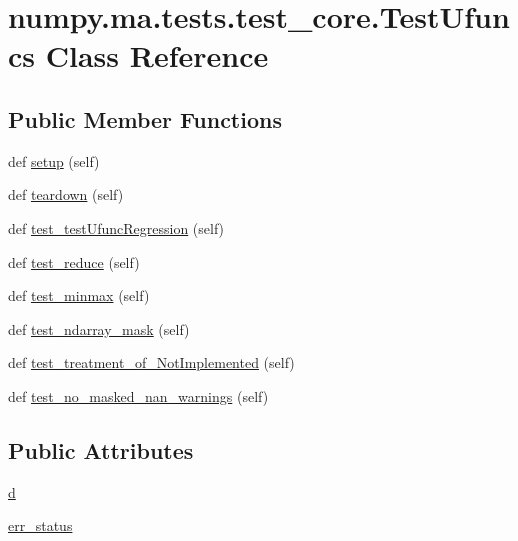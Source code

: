 \hypertarget{classnumpy_1_1ma_1_1tests_1_1test__core_1_1TestUfuncs}{}\section{numpy.\+ma.\+tests.\+test\+\_\+core.\+Test\+Ufuncs Class Reference}
\label{classnumpy_1_1ma_1_1tests_1_1test__core_1_1TestUfuncs}
\subsection*{Public Member Functions}
\begin{DoxyCompactItemize}
\item 
def \hyperlink{classnumpy_1_1ma_1_1tests_1_1test__core_1_1TestUfuncs_ae4b69c0da441b994929796cde8367c26}{setup} (self)
\item 
def \hyperlink{classnumpy_1_1ma_1_1tests_1_1test__core_1_1TestUfuncs_a0fa08a88d54511c481212879f6190aa0}{teardown} (self)
\item 
def \hyperlink{classnumpy_1_1ma_1_1tests_1_1test__core_1_1TestUfuncs_afe19a18d7c7882e99867d5b29beeda1f}{test\+\_\+test\+Ufunc\+Regression} (self)
\item 
def \hyperlink{classnumpy_1_1ma_1_1tests_1_1test__core_1_1TestUfuncs_abd06c0ee9a6edbfdf91a501edf1ca208}{test\+\_\+reduce} (self)
\item 
def \hyperlink{classnumpy_1_1ma_1_1tests_1_1test__core_1_1TestUfuncs_a8904789ec7eae0da6c020bab49cbf3c0}{test\+\_\+minmax} (self)
\item 
def \hyperlink{classnumpy_1_1ma_1_1tests_1_1test__core_1_1TestUfuncs_a87143d7e496aa17862db5ad7ee294c02}{test\+\_\+ndarray\+\_\+mask} (self)
\item 
def \hyperlink{classnumpy_1_1ma_1_1tests_1_1test__core_1_1TestUfuncs_a00bc2dd37714732a4a7a30b72de9781e}{test\+\_\+treatment\+\_\+of\+\_\+\+Not\+Implemented} (self)
\item 
def \hyperlink{classnumpy_1_1ma_1_1tests_1_1test__core_1_1TestUfuncs_a2bb178ef1cf38a3928b88bf71b179861}{test\+\_\+no\+\_\+masked\+\_\+nan\+\_\+warnings} (self)
\end{DoxyCompactItemize}
\subsection*{Public Attributes}
\begin{DoxyCompactItemize}
\item 
\hyperlink{classnumpy_1_1ma_1_1tests_1_1test__core_1_1TestUfuncs_a01aef20ce777113fc76cc8c8af6221d3}{d}
\item 
\hyperlink{classnumpy_1_1ma_1_1tests_1_1test__core_1_1TestUfuncs_a94e0fa9a5562c31dd4092aad1fc09905}{err\+\_\+status}
\end{DoxyCompactItemize}


